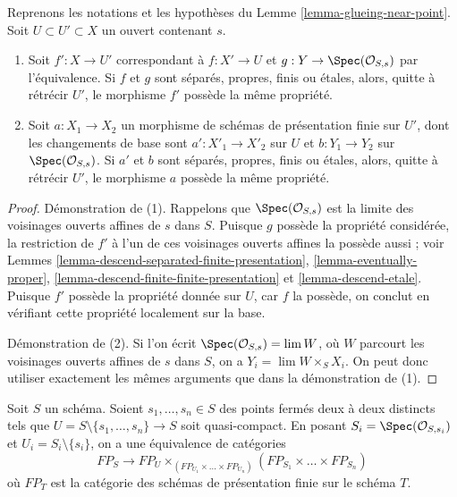 \begin{lemma}
\label{lemma-glueing-near-point-properties}
Reprenons les notations et les hypothèses du Lemme \ref{lemma-glueing-near-point}.
Soit $U \subset U' \subset X$ un ouvert contenant $s$.
\begin{enumerate}
\item Soit $f' : X \to U'$ correspondant à $f : X' \to U$ et
$g : Y \to \Spec(\mathcal{O}_{S, s})$
par l'équivalence. Si $f$ et $g$ sont séparés, propres, finis ou \'etales,
alors, quitte à rétrécir $U'$, le morphisme $f'$ possède la même propriété.
\item Soit $a : X_1 \to X_2$
un morphisme de schémas de présentation finie sur $U'$,
dont les changements de base sont $a' : X'_1 \to X'_2$ sur $U$ et
$b : Y_1 \to Y_2$ sur $\Spec(\mathcal{O}_{S, s})$.
Si $a'$ et $b$ sont séparés, propres, finis ou \'etales,
alors, quitte à rétrécir $U'$, le morphisme $a$ possède la même propriété.
\end{enumerate}
\end{lemma}

\begin{proof}
Démonstration de (1). Rappelons que $\Spec(\mathcal{O}_{S, s})$ est la limite des
voisinages ouverts affines de $s$ dans $S$. Puisque $g$ possède la propriété
considérée, la restriction de $f'$ à l'un de ces
voisinages ouverts affines la possède aussi ; voir
Lemmes \ref{lemma-descend-separated-finite-presentation},
\ref{lemma-eventually-proper},
\ref{lemma-descend-finite-finite-presentation} et
\ref{lemma-descend-etale}.
Puisque $f'$ possède la propriété donnée sur $U$, car $f$ la possède,
on conclut en vérifiant cette propriété localement sur la base.

\medskip\noindent
Démonstration de (2). Si l'on écrit $\Spec(\mathcal{O}_{S, s}) = \lim W$,
où $W$ parcourt les voisinages ouverts affines de $s$ dans $S$,
on a $Y_i = \lim W \times_S X_i$. On peut donc utiliser
exactement les mêmes arguments que dans la démonstration de (1).
\end{proof}

\begin{lemma}
\label{lemma-glueing-near-multiple-closed-points}
Soit $S$ un schéma. Soient $s_1, \ldots, s_n \in S$ des points fermés
deux à deux distincts tels que
$U = S \setminus \{s_1, \ldots, s_n\} \to S$ soit quasi-compact. En posant
$S_i = \Spec(\mathcal{O}_{S, s_i})$ et $U_i = S_i \setminus \{s_i\}$,
on a une équivalence de catégories
$$
FP_S \longrightarrow
FP_U \times_{(FP_{U_1} \times \ldots \times FP_{U_n})}
(FP_{S_1} \times \ldots \times FP_{S_n})
$$
où $FP_T$ est la catégorie des schémas de présentation finie sur
le schéma $T$.
\end{lemma}

